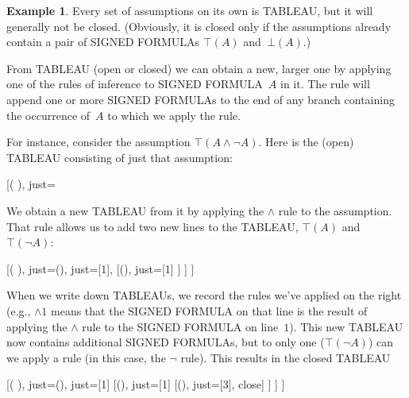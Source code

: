 \documentclass[10pt,a4paper]{article}
\newcommand*{\olup}[1]{\MakeUppercase{#1}}
\theoremstyle{plain}
\theoremstyle{definition}
\newtheorem{ex}[thm]{Example}
\theoremstyle{remark}
\providecommand{\sFmla}[2]{#1(#2)}
\providecommand{\formula}{\relax}
\providecommand{\True}{\top}
\providecommand{\False}{\bot}
\providecommand{\TAss}[1]{}
\providecommand{\TRule}[1]{}
\providecommand{\formula}[1]{#1}
\begin{document}
\begin{ex}
  Every set of assumptions on its own is \olup{tableau}, but it will
  generally not be closed. (Obviously, it is closed only if the
  assumptions already contain a pair of \olup{signed formula}s
  $\sFmla{\True}{A}$ and~$\sFmla{\False}{A}$.)

  From \olup{tableau} (open or closed) we can obtain a new, larger one by
  applying one of the rules of inference to \olup{signed formula}~$A$
  in it. The rule will append one or more \olup{signed formula}s to the end of
  any branch containing the occurrence of~$A$ to which we apply the
  rule.

  For instance, consider the assumption $\sFmla{\True}{A \land \lnot
    A}$. Here is the (open) \olup{tableau} consisting of just that
  assumption:
  \begin{center}
    \begin{tableau}{}
      [\sFmla{\True}{\formula{A} \land \lnot \formula{A}}, just=\TAss]
    \end{tableau}{}
  \end{center}
  We obtain a new \olup{tableau} from it by applying the $\TRule{\True}{\land}$
  rule to the assumption. That rule allows us to add two new lines to
  the \olup{tableau}, $\sFmla{\True}{A}$ and $\sFmla{\True}{\lnot A}$:
  \begin{center}
    \begin{tableau}{}
      [\sFmla{\True}{\formula{A} \land \lnot \formula{A}}, just=\TAss
        [\sFmla{\True}{\formula{A}}, just={\TRule{\True}{\land}[1]},
          [\sFmla{\True}{\lnot \formula{A}}, just={\TRule{\True}{\land}[1]}
          ]
        ]
      ]
    \end{tableau}{}
  \end{center}
  When we write down \olup{tableau}s, we record the rules we've applied
  on the right (e.g., $\TRule{\True}{\land} 1$ means that the
  \olup{signed formula} on that line is the result of applying the
  $\TRule{\True}{\land}$ rule to the \olup{signed formula} on line~$1$).
  This new \olup{tableau} now contains additional \olup{signed formula}s,
  but to only one ($\sFmla{\True}{\lnot A}$) can we apply a rule (in
  this case, the $\TRule{\True}{\lnot}$ rule). This results in the closed
  \olup{tableau}
  \begin{center}
    \begin{tableau}{}
      [\sFmla{\True}{\formula{A} \land \lnot \formula{A}}, just=\TAss
        [\sFmla{\True}{\formula{A}}, just={\TRule{\True}{\land}[1]}
          [\sFmla{\True}{\lnot \formula{A}}, just={\TRule{\True}{\land}[1]}
            [\sFmla{\False}{\formula{A}}, just={\TRule{\True}{\lnot}[3]}, close]
          ]
        ]
      ]
    \end{tableau}{}
  \end{center}
\end{ex}
\end{document}
